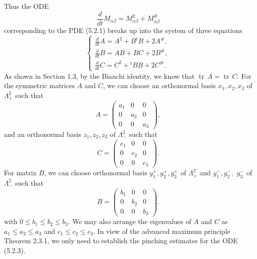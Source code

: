 Thus the ODE
$$
\frac{d}{dt}M_{\alpha\beta}=M_{\alpha\beta}^2+M_{\alpha\beta}^\#
$$
corresponding to the PDE (5.2.1) breaks up into the system of
three equations \begin{equation}
   \left\{
   \begin{array}{lll}
    \frac {d }{d t}A=A^2+B {^tB}+2A^\#,
         \\[3mm]
    \frac {d }{d t}B=AB+BC+2B^\#,
         \\[3mm]
    \frac {d }{d t}C=C^2+ {^tB}B+2C^\#.
\end{array}
\right. %
\end{equation} As shown in Section 1.3, by the Bianchi identity, we know that
$\operatorname{tr}\, A=\operatorname{tr}\, C.$ For the symmetric matrices $A$ and $C$, we can
choose an orthonormal basis $x_1,x_2,x_3$ of $\Lambda^2_+$ such
that
$$
 A=
{ \left(
  \begin{array}{ccc}
    a_1&   0 &   0\\[4mm]
    0 &   a_2 &   0\\[4mm]
    0 &   0 &   a_3
\end{array}
\right),}
$$
and an orthonormal basis $z_1,z_2,z_3$ of $\Lambda^2_-$ such that
$$
 C=
{ \left(
  \begin{array}{ccc}
    c_1&   0 &   0\\[4mm]
    0 &   c_2 &   0\\[4mm]
    0 &   0 &   c_3
\end{array}
\right).}
$$
For matrix $B$, we can choose orthonormal basis
$y_1^+,y_2^+,y_3^+$ of $\Lambda^2_+$ and $y_1^-,y_2^-,$ $y_3^-$ of
$\Lambda^2_-$ such that
$$
 B=
{ \left(
  \begin{array}{ccc}
    b_1&   0 &   0\\[4mm]
    0 &   b_2 &   0\\[4mm]
    0 &   0 &   b_3
\end{array}
\right).}
$$
with $0\leq b_1\leq b_2\leq b_3$. We may also arrange the
eigenvalues of $A$ and $C$ as $a_1\leq a_2\leq a_3$ and $c_1\leq
c_2\leq c_3$. In view of the advanced maximum principle Theorem
2.3.1, we only need to establish the pinching estimates for the
ODE (5.2.3).

